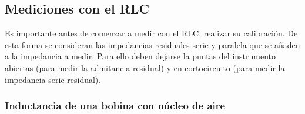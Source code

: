 \documentclass[a4paper,10pt]{article}
\begin{document}
	\subsection{Mediciones con el RLC}		
		\indent Es importante antes de comenzar a medir con el RLC, realizar su 
		calibraci\'on. De esta forma se consideran las impedancias residuales 
		serie y paralela que se a\~naden a la impedancia a medir. Para ello 
		deben dejarse la puntas del instrumento abiertas (para medir la 
		admitancia residual) y en cortocircuito (para medir la impedancia serie 
		residual).

		\subsubsection{Inductancia de una bobina con n\'ucleo de aire}
		
\end{document}
